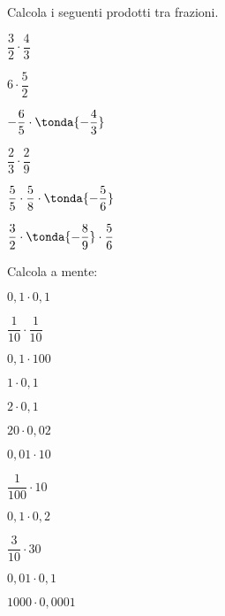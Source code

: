 \pagebreak %

\begin{esercizio}
\label{ese:3.48}
Calcola i seguenti prodotti tra frazioni.

\begin{htmulticols}{3}
\begin{enumeratees}
\spazielenx
 \item \(\dfrac{3}{2}\cdot\dfrac{4}{3}\)
 \item \(6\cdot\dfrac{5}{2}\)
 \item \(-\dfrac{6}{5}\cdot\tonda{-\dfrac{4}{3}}\)
 \item \(\dfrac{2}{3}\cdot\dfrac{2}{9}\)
 \item \(\dfrac{5}{5}\cdot\dfrac{5}{8}\cdot\tonda{-\dfrac{5}{6}}\)
 \item \(\dfrac{3}{2}\cdot\tonda{-\dfrac{8}{9}}\cdot\dfrac{5}{6}\)
\end{enumeratees}
\end{htmulticols}
\end{esercizio}

\begin{esercizio}
Calcola a mente:
\label{ese:3.51}

\begin{htmulticols}{4}
 \begin{enumeratees}
 \spazielenx
\item \(0,1\cdot 0,1\)
\item \(\dfrac{1}{10}\cdot\dfrac{1}{10}\)
\item \(0,1\cdot 100\)
\item \(1\cdot 0,1\)
\item \(2\cdot 0,1\)
\item \(20\cdot 0,02\)
\item \(0,01\cdot 10\)
\item \(\dfrac{1}{100}\cdot 10\)
\item \(0,1\cdot 0,2\)
\item \(\dfrac{3}{10}\cdot 30\)
\item \(0,01\cdot 0,1\)
\item \(1000\cdot 0,0001\)
 \end{enumeratees}
\end{htmulticols}
\end{esercizio}


